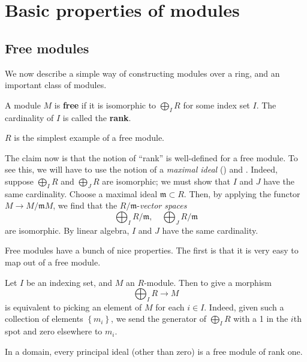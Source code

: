 \section{Basic properties of modules}

\subsection{Free modules}

We now describe a simple way of constructing modules over a ring, and an
important class of modules.

\begin{definition} 
A module $M$ is \textbf{free} if it is isomorphic to $\bigoplus_I R$ for some
index set $I$. The cardinality of $I$ is called the \textbf{rank}.
\end{definition} 

\begin{example} 
$R$ is the simplest example of a free module.
\end{example} 

The claim now is that the notion of ``rank'' is well-defined for a free
module. To see this, we will have to use the notion 
of a \emph{maximal ideal} () and
.
Indeed, suppose
$\bigoplus_I R$ and $\bigoplus_J R$ are isomorphic; we must show that $I$ and
$J$ have the same cardinality. Choose a maximal ideal $\mathfrak{m}
\subset R$. Then, by applying the functor $M \to
M/\mathfrak{m}M$, we find that the $R/\mathfrak{m}$-\emph{vector spaces}
\[ \bigoplus_I R/\mathfrak{m}, \quad \bigoplus_J R/\mathfrak{m}  \]
are isomorphic. By linear algebra, $I$ and $J$ have the same cardinality. 


Free modules have a bunch of nice properties. The first is that it is very
easy to map out of a free module.
\begin{example} 
Let $I$ be an indexing set, and $M$ an $R$-module. Then to give a morphism
\[ \bigoplus_I R \to M  \]
is equivalent to picking an element of $M$ for each $i \in I$. Indeed, given
such a collection of elements $\left\{m_i\right\}$, we send the generator of $\bigoplus_I R$ with a 1
in the $i$th spot and zero elsewhere to $m_i$.
\end{example}

\begin{example} 
In a domain, every principal ideal (other than zero) is a free module of rank
one.
\end{example} 

